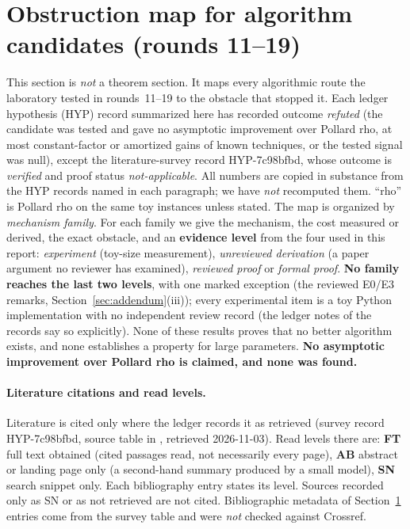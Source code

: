 \documentclass[11pt,a4paper]{article}
\theoremstyle{remark}
\begin{document}
\section{Obstruction map for algorithm candidates (rounds 11--19)}\label{sec:bench}
This section is \emph{not} a theorem section. It maps every algorithmic route the laboratory tested in rounds~11--19 to the obstacle that stopped it. Each ledger hypothesis (HYP) record summarized here has recorded outcome \emph{refuted} (the candidate was tested and gave no asymptotic improvement over Pollard rho, at most constant-factor or amortized gains of known techniques, or the tested signal was null), except the literature-survey record \mbox{HYP-7c98bfbd}, whose outcome is \emph{verified} and proof status \emph{not-applicable}.
All numbers are copied in substance from the HYP records named in each paragraph; we have \emph{not} recomputed them. ``rho'' is Pollard rho on the same toy instances unless stated.
The map is organized by \emph{mechanism family}. For each family we give the mechanism, the cost measured or derived, the exact obstacle, and an \textbf{evidence level} from the four used in this report: \emph{experiment} (toy-size measurement), \emph{unreviewed derivation} (a paper argument no reviewer has examined), \emph{reviewed proof} or \emph{formal proof}. \textbf{No family reaches the last two levels}, with one marked exception (the reviewed E0/E3 remarks, Section~\ref{sec:addendum}(iii)); every experimental item is a toy Python implementation with no independent review record (the ledger notes of the records say so explicitly). None of these results proves that no better algorithm exists, and none establishes a property for large parameters. \textbf{No asymptotic improvement over Pollard rho is claimed, and none was found.}

\paragraph{Literature citations and read levels.} Literature is cited only where the ledger records it as retrieved (survey record \mbox{HYP-7c98bfbd}, source table in , retrieved 2026-11-03). Read levels there are: \textbf{FT} full text obtained (cited passages read, not necessarily every page), \textbf{AB} abstract or landing page only (a second-hand summary produced by a small model), \textbf{SN} search snippet only. Each bibliography entry states its level. Sources recorded only as SN or as not retrieved are not cited. Bibliographic metadata of Section~\ref{sec:bench} entries come from the survey table and were \emph{not} checked against Crossref.
\end{document}
